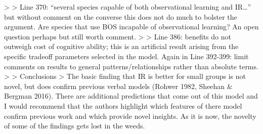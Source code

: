 >
> Line 370: “several species capable of both observational learning and IR…” but without comment on the converse this does not do much to bolster the argument. Are species that use BOS incapable of observational learning? An open question perhaps but still worth comment.
>
> Line 386: benefits do not outweigh cost of cognitive ability; this is an artificial result arising from the specific tradeoff parameters selected in the model. Again in Line 392-399: limit comments on results to general patterns/relationships rather than absolute terms.
>
> Conclusions
> The basic finding that IR is better for small groups is not novel, but does confirm previous verbal models (Rohwer 1982, Sheehan & Bergman 2016). There are additional predictions that come out of this model and I would recommend that the authors highlight which features of there model confirm previous work and which provide novel insights. As it is now, the novelty of some of the findings gets lost in the weeds.
